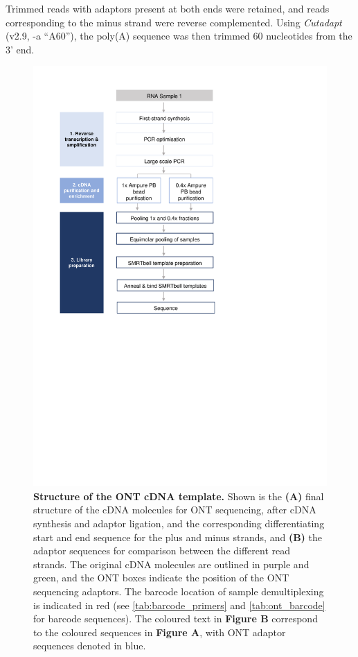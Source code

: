 Trimmed reads with adaptors present at both ends were retained, and reads corresponding to the minus strand were reverse complemented. Using \textit{Cutadapt}\cite{Martin2011} (v2.9, -a “A{60}”), the poly(A) sequence was then trimmed 60 nucleotides from the 3' end.

\begin{figure}[ht]
	\begin{center}
		\includegraphics[page=22,trim={0cm 17cm 0cm 1cm},clip, scale = 0.7]{Figures/ProjectDevelopment_Figures.pdf}
	\end{center}
	\captionsetup{width=0.95\textwidth}
	\caption[Structure of the ONT cDNA template]%
	{\textbf{Structure of the ONT cDNA template.} Shown is the \textbf{(A)} final structure of the cDNA molecules for ONT sequencing, after cDNA synthesis and adaptor ligation, and the corresponding differentiating start and end sequence for the plus and minus strands, and \textbf{(B)} the adaptor sequences for comparison between the different read strands. The original cDNA molecules are outlined in purple and green, and the ONT boxes indicate the position of the ONT sequencing adaptors. The barcode location of sample demultiplexing is indicated in red (see \cref{tab:barcode_primers} and \cref{tab:ont_barcode} for barcode sequences). The coloured text in \textbf{Figure B} correspond to the coloured sequences in \textbf{Figure A}, with ONT adaptor sequences denoted in blue. 
}
\end{figure}
